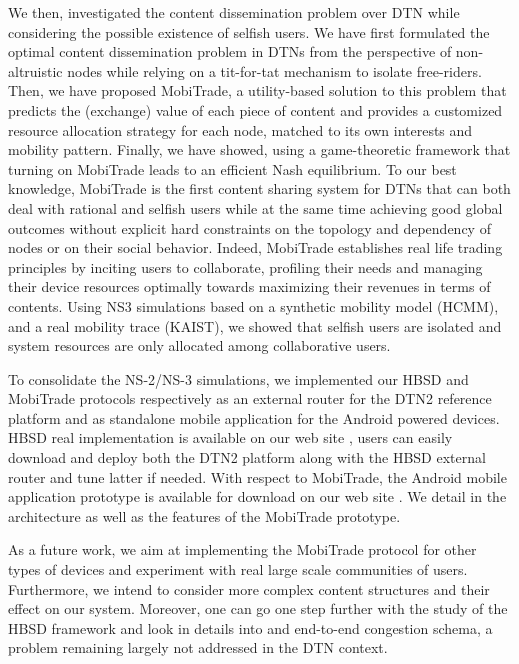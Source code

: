 We then, investigated the content dissemination problem over DTN while considering the possible existence of selfish users. We have first formulated the optimal content dissemination problem in DTNs from the perspective of non-altruistic nodes while relying on a tit-for-tat mechanism to isolate free-riders. Then, we have proposed MobiTrade, a utility-based solution to this problem that predicts the (exchange) value of each piece of content and provides a customized resource allocation strategy for each node, matched to its own interests and mobility pattern. Finally, we have showed, using a game-theoretic framework that turning on MobiTrade leads to an efficient Nash equilibrium. To our best knowledge, MobiTrade is the first content sharing
system for DTNs that can both deal with rational and selfish users while at the same time achieving good global outcomes
without explicit hard constraints on the topology and dependency of nodes or on their social behavior. Indeed, MobiTrade establishes real life trading principles by inciting users to collaborate, profiling their needs and managing their device resources optimally towards maximizing their revenues in terms of contents. Using NS3 simulations based on a synthetic mobility model (HCMM), and a real mobility trace (KAIST), we showed that selfish users are isolated and system resources are only allocated among collaborative users. 

To consolidate the NS-2/NS-3 simulations, we implemented our HBSD and MobiTrade protocols respectively as an external router for the DTN2 reference platform and as standalone mobile application for the Android powered devices. HBSD real implementation is available on our web site \cite{HBSDDTN2}, users can easily download and deploy both the DTN2 platform along with the HBSD external router and tune latter if needed. With respect to MobiTrade, the Android mobile application prototype is available for download on our web site \cite{MobiTradeAndroid}. We detail in \cite{MobiTradeAndroid} the architecture as well as the features of the MobiTrade prototype. 

As a future work, we aim at implementing the MobiTrade protocol for other types of devices and experiment with real large scale communities of users. Furthermore, we intend to consider more complex content structures and their effect on our system. Moreover, one can go one step further with the study of the HBSD framework and look in details into and end-to-end congestion schema, a problem remaining largely not addressed in the DTN context. 

